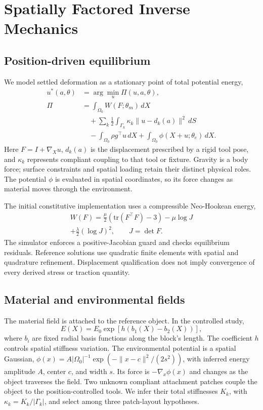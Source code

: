 \documentclass[10pt,twocolumn,letterpaper]{article}
\begin{document}
\section{Spatially Factored Inverse Mechanics}
\subsection{Position-driven equilibrium}
We model settled deformation as a stationary point of total potential energy,
\begin{align}
 u^*(a,\theta)&=\arg\min_u\Pi(u,a,\theta),\\
 \Pi&=\int_{\Omega_0}W(F;\theta_m)\,dX
\nonumber\\
 &\quad+\sum_k\frac12\int_{\Gamma_k}\kappa_k\|u-d_k(a)\|^2\,dS\nonumber\\
 &\quad-\int_{\Omega_0}\rho g^\top u\,dX
 +\int_{\Omega_0}\phi(X+u;\theta_e)\,dX.\label{eq:energy}
\end{align}
Here $F=I+\nabla_Xu$, $d_k(a)$ is the displacement prescribed by a rigid tool pose, and $\kappa_k$ represents compliant coupling to that tool or fixture. Gravity is a body force; surface constraints and spatial loading retain their distinct physical roles. The potential $\phi$ is evaluated in spatial coordinates, so its force changes as material moves through the environment.

The initial constitutive implementation uses a compressible Neo-Hookean energy,
\begin{multline}
 W(F)=\frac\mu2(\mathrm{tr}(F^\top F)-3)-\mu\log J
       \\
 +\frac\lambda2(\log J)^2,\qquad J=\det F.
\end{multline}
The simulator enforces a positive-Jacobian guard and checks equilibrium residuals. Reference solutions use quadratic finite elements with spatial and quadrature refinement. Displacement qualification does not imply convergence of every derived stress or traction quantity.

\subsection{Material and environmental fields}
The material field is attached to the reference object. In the controlled study,
\begin{equation}
 E(X)=E_0\exp\!\left[h\left(b_1(X)-b_2(X)\right)\right],
\end{equation}
where $b_i$ are fixed radial basis functions along the block's length. The coefficient $h$ controls spatial stiffness variation. The environmental potential is a spatial Gaussian, $\phi(x)=A|\Omega_0|^{-1}\exp(-\|x-c\|^2/(2s^2))$, with inferred energy amplitude $A$, center $c$, and width $s$. Its force is $-\nabla_x\phi(x)$ and changes as the object traverses the field. Two unknown compliant attachment patches couple the object to the position-controlled tools. We infer their total stiffnesses $K_k$, with $\kappa_k=K_k/|\Gamma_k|$, and select among three patch-layout hypotheses.
\end{document}
